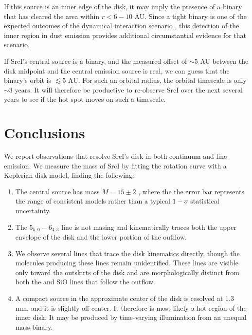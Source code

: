 \documentclass[twocolumn]{aastex61}
\newcommand{\sourcei}{SrcI\xspace}
\begin{document}
If this source is an inner edge of the disk, it may imply the presence of a
binary that has cleared the area within $r<6-10$ AU.  Since a tight binary is
one of the expected outcomes of the dynamical interaction scenario
\citep{Goddi2011b}, this
detection of the inner region in dust emission provides additional
circumstantial evidence for that scenario.

If SrcI's central source is a binary, and the measured offset of $\sim5$ AU
between the disk midpoint and the central emission source is real, we can guess
that the binary's orbit is $\lesssim5$ AU.  For such an orbital radius, the
orbital timescale is only $\sim3$ years.   It will therefore be productive to
re-observe \sourcei over the next several years to see if the hot spot moves on
such a timescale.

\section{Conclusions}
\label{sec:conclusions}
We report observations that resolve \sourcei's disk in both continuum
and line emission.  We measure the mass of \sourcei by fitting the 
rotation curve with a Keplerian disk model, finding the following:

\begin{enumerate}
    \item The central source has mass $M=15\pm2$ \msun, where the the error
        bar represents the range of consistent models rather than a typical
        $1-\sigma$ statistical uncertainty. 
    \item The \water $5_{5,0}-6_{4,3}$ line is not masing and kinematically
        traces both the upper envelope of the disk and the lower portion of the
        outflow. \\
    \item We observe several lines that trace the disk kinematics
        directly, though the molecules producing these lines remain
        unidentified.  These lines are visible only toward the outskirts of the
        disk and are morphologically distinct from both the \water and SiO
        lines that follow the outflow. 
    \item A compact source in the approximate center of the disk
        is resolved at 1.3 mm, and it is slightly off-center.  It therefore is
        most likely a hot region of the inner disk.  It may be produced
        by time-varying illumination from an unequal mass binary.
\end{enumerate}
\end{document}
